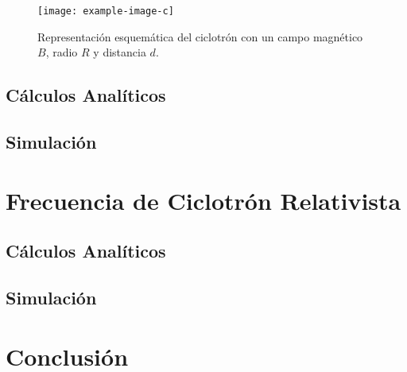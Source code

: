 \documentclass[journal]{IEEEtran}
\begin{document}
\begin{figure}[!htb]
    \texttt{[image: example-image-c]}
    \caption{Representación esquemática del ciclotrón con un campo magnético $B$, radio $R$ y distancia $d$.}
    \label{fig:ciclotron}
\end{figure}

\subsection{Cálculos Analíticos}

\subsection{Simulación}

\clearpage

\section{Frecuencia de Ciclotrón Relativista}
\label{sec:frecuencia}

\subsection{Cálculos Analíticos}

\subsection{Simulación}

\clearpage

\section{Conclusión}
\label{sec:conclusion}
\end{document}
